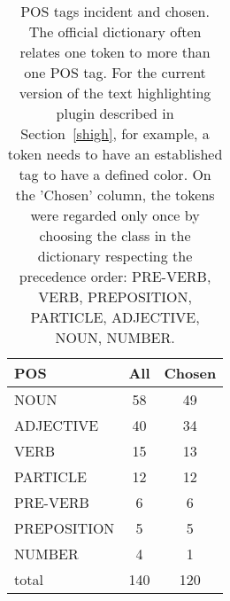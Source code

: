 \begin{table*}[h!]
\begin{center}
\caption{POS tags incident and chosen.
            The official dictionary often relates one token
            to more than one POS tag.
            For the current version of the text highlighting plugin described in
            Section~\ref{shigh}, for example,
            a token needs to have an established tag to have
            a defined color.
            On the 'Chosen' column, the tokens were regarded only once
            by choosing the class in the dictionary respecting the
            precedence order: PRE-VERB, VERB, PREPOSITION, PARTICLE, ADJECTIVE, NOUN, NUMBER.}\label{foobar}
\begin{tabular}{ l | c c }
POS & All  & Chosen \\\hline
NOUN & 58  & 49 \\
ADJECTIVE & 40  & 34 \\
VERB & 15  & 13 \\
PARTICLE & 12  & 12 \\
PRE-VERB & 6  & 6 \\
PREPOSITION & 5  & 5 \\
NUMBER & 4  & 1 \\\hline
total & 140  & 120 \\
\end{tabular}\end{center}
\end{table*}
